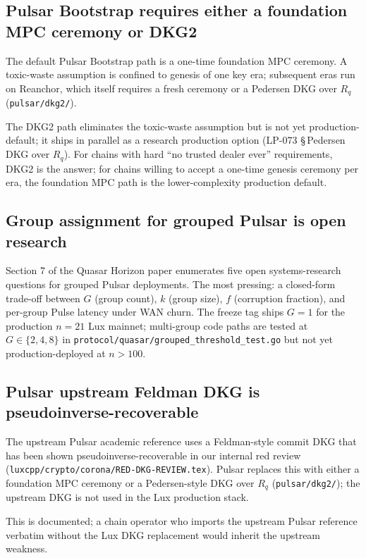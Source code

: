 \documentclass[11pt]{article}
\begin{document}
\subsection{Pulsar Bootstrap requires either a foundation MPC ceremony or DKG2}

The default Pulsar Bootstrap path is a one-time foundation MPC ceremony. A
toxic-waste assumption is confined to genesis of one key era; subsequent eras
run on Reanchor, which itself requires a fresh ceremony or a Pedersen DKG over
$R_q$ (\verb|pulsar/dkg2/|).

The DKG2 path eliminates the toxic-waste assumption but is not yet
production-default; it ships in parallel as a research production option
(LP-073 \S\,Pedersen DKG over $R_q$). For chains with hard ``no trusted dealer
ever'' requirements, DKG2 is the answer; for chains willing to accept a
one-time genesis ceremony per era, the foundation MPC path is the
lower-complexity production default.

\subsection{Group assignment for grouped Pulsar is open research}

Section 7 of the Quasar Horizon paper enumerates five open systems-research
questions for grouped Pulsar deployments. The most pressing: a closed-form
trade-off between $G$ (group count), $k$ (group size), $f$ (corruption
fraction), and per-group Pulse latency under WAN churn. The freeze tag ships
$G = 1$ for the production $n = 21$ Lux mainnet; multi-group code paths are
tested at $G \in \{2, 4, 8\}$ in
\verb|protocol/quasar/grouped_threshold_test.go| but not yet
production-deployed at $n > 100$.

\subsection{Pulsar upstream Feldman DKG is pseudoinverse-recoverable}

The upstream Pulsar academic reference uses a Feldman-style commit DKG that
has been shown pseudoinverse-recoverable in our internal red review
(\verb|luxcpp/crypto/corona/RED-DKG-REVIEW.tex|). Pulsar replaces this with
either a foundation MPC ceremony or a Pedersen-style DKG over $R_q$
(\verb|pulsar/dkg2/|); the upstream DKG is not used in the Lux production
stack.

This is documented; a chain operator who imports the upstream Pulsar
reference verbatim without the Lux DKG replacement would inherit the upstream
weakness.
\end{document}

